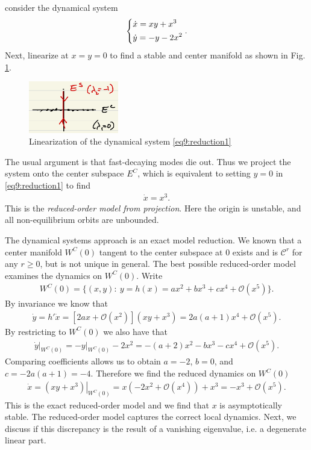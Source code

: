 \begin{ex}[]
	consider the dynamical system
	\begin{align}
		\begin{dcases}
			\dot{x} = x y + x^{3} \\
			\dot{y} = -y - 2x^{2}
		\end{dcases}
		.\label{eq9:reduction1}
	\end{align}
	Next, linearize at $x=y=0$ to find a stable and center manifold as shown in Fig. \ref{fig:reduction_linearization1}.
	\begin{figure}[h!]
		\centering
		\includegraphics[width=0.35\textwidth]{figures/ch9/25reduction_linearization1.png}
		\caption{Linearization of the dynamical system \eqref{eq9:reduction1}}
		\label{fig:reduction_linearization1}
	\end{figure}
	The usual argument is that fast-decaying modes die out. Thus we project the system onto the center subspace $E^{C}$, which is equivalent to setting $y=0$ in \eqref{eq9:reduction1} to find
	\begin{align}
		\dot{x} = x^3.
	\end{align}
	This is the \emph{reduced-order model from projection}. Here the origin is unstable, and all non-equilibrium orbits are unbounded.

	The dynamical systems approach is an exact model reduction. We known that a center manifold $W^{C}(0)$ tangent to the center subspace at $0 $ exists and is $\mathcal{C}^{r} $ for any $r\geq 0 $, but is not unique in general. The best possible reduced-order model examines the dynamics on $W^{C}(0) $. Write
	\begin{align}
		W^{C}(0) = \{(x,y):\ y = h(x) = ax^2 + bx^3 + cx^4 + \mathcal{O}(x^5) \}.
	\end{align}
By invariance we know that
 \begin{align}
 \dot{y} = h' \dot{x} = \left[ 2 a x + \mathcal{O}(x^{2}) \right] \left( xy + x^{3}\right) = 2a(a+1)x^{4} + \mathcal{O}(x^{5}).
\end{align}
By restricting to $W^{C}(0)$ we also have that
\begin{align}
	\left.\dot{y} \right|_{W^{C}(0)} = \left.-y\right|_{W^{C}(0)} - 2x^2 = -(a+2)x^{2} - bx^3 - cx^4 + \mathcal{O}(x^{5}).
\end{align}
Comparing coefficients allows us to obtain $a=-2$, $b=0$, and $c=-2a(a+1)=-4$. Therefore we find the reduced dynamics on $W^{C}(0)$ 
\begin{align}
	\dot{x} = \left.(xy+x^3)\right|_{W^{C}(0)} = x(-2x^2 + \mathcal{O}(x^4) ) + x^3	= -x^3 + \mathcal{O}(x^5).
\end{align}
This is the exact reduced-order model and we find that $x$ is asymptotically stable. The reduced-order model captures the correct local dynamics. Next, we discuss if this discrepancy is the result of a vanishing eigenvalue, i.e. a degenerate linear part.
\end{ex}


